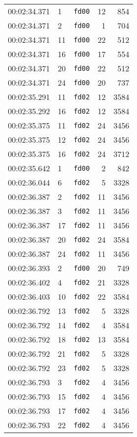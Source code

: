 \documentclass{article}
\begin{document}
\begin{longtable}{lllrr}
00:02:34.371 & 1 & \texttt{fd00} & 12 & 854 \\
00:02:34.371 & 2 & \texttt{fd00} & 1 & 704 \\
00:02:34.371 & 11 & \texttt{fd00} & 22 & 512 \\
00:02:34.371 & 16 & \texttt{fd00} & 17 & 554 \\
00:02:34.371 & 20 & \texttt{fd00} & 22 & 512 \\
00:02:34.371 & 24 & \texttt{fd00} & 20 & 737 \\
00:02:35.291 & 11 & \texttt{fd02} & 12 & 3584 \\
00:02:35.292 & 16 & \texttt{fd02} & 12 & 3584 \\
00:02:35.375 & 11 & \texttt{fd02} & 24 & 3456 \\
00:02:35.375 & 12 & \texttt{fd02} & 24 & 3456 \\
00:02:35.375 & 16 & \texttt{fd02} & 24 & 3712 \\
00:02:35.642 & 1 & \texttt{fd00} & 2 & 842 \\
00:02:36.044 & 6 & \texttt{fd02} & 5 & 3328 \\
00:02:36.387 & 2 & \texttt{fd02} & 11 & 3456 \\
00:02:36.387 & 3 & \texttt{fd02} & 11 & 3456 \\
00:02:36.387 & 17 & \texttt{fd02} & 11 & 3456 \\
00:02:36.387 & 20 & \texttt{fd02} & 24 & 3584 \\
00:02:36.387 & 24 & \texttt{fd02} & 11 & 3456 \\
00:02:36.393 & 2 & \texttt{fd00} & 20 & 749 \\
00:02:36.402 & 4 & \texttt{fd02} & 21 & 3328 \\
00:02:36.403 & 10 & \texttt{fd02} & 22 & 3584 \\
00:02:36.792 & 13 & \texttt{fd02} & 5 & 3328 \\
00:02:36.792 & 14 & \texttt{fd02} & 4 & 3584 \\
00:02:36.792 & 18 & \texttt{fd02} & 13 & 3584 \\
00:02:36.792 & 21 & \texttt{fd02} & 5 & 3328 \\
00:02:36.792 & 23 & \texttt{fd02} & 5 & 3328 \\
00:02:36.793 & 3 & \texttt{fd02} & 4 & 3456 \\
00:02:36.793 & 15 & \texttt{fd02} & 4 & 3456 \\
00:02:36.793 & 17 & \texttt{fd02} & 4 & 3456 \\
00:02:36.793 & 22 & \texttt{fd02} & 4 & 3456 \\

\end{longtable}
\end{document}
